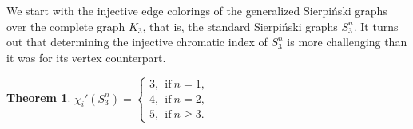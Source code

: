 \documentclass{article}
\newtheorem{theorem}{Theorem}[section]
\newtheorem{observation}[theorem]{Observation}
\begin{document}


We start with the injective edge colorings of the generalized Sierpi\'nski graphs over the complete graph $K_3$, that is, the standard Sierpi\'{n}ski graphs $S_3^n$. It turns out that determining the injective chromatic index of $S_3^n$ is more challenging than it was for its vertex counterpart. 
\begin{theorem}
$\chi_i'(S_3^n)= \begin{cases}
	           3, ~~\textrm{if}~ n=1,\\
	           4, ~~\textrm{if}~ n=2,\\
	           5, ~ ~\textrm{if}~ n\geq 3. 
	          \end{cases}$
\end{theorem}
\end{document}
